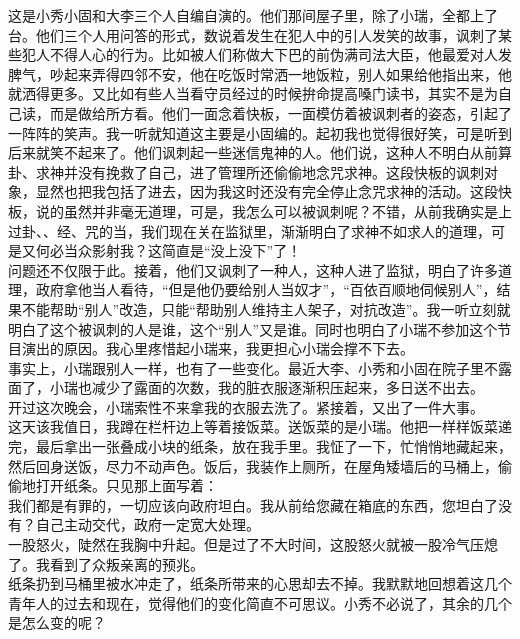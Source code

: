 这是小秀小固和大李三个人自编自演的。他们那间屋子里，除了小瑞，全都上了台。他们三个人用问答的形式，数说着发生在犯人中的引人发笑的故事，讽刺了某些犯人不得人心的行为。比如被人们称做大下巴的前伪满司法大臣，他最爱对人发脾气，吵起来弄得四邻不安，他在吃饭时常洒一地饭粒，别人如果给他指出来，他就洒得更多。又比如有些人当看守员经过的时候拚命提高嗓门读书，其实不是为自己读，而是做给所方看。他们一面念着快板，一面模仿着被讽刺者的姿态，引起了一阵阵的笑声。我一听就知道这主要是小固编的。起初我也觉得很好笑，可是听到后来就笑不起来了。他们讽刺起一些迷信鬼神的人。他们说，这种人不明白从前算卦、求神并没有挽救了自己，进了管理所还偷偷地念咒求神。这段快板的讽刺对象，显然也把我包括了进去，因为我这时还没有完全停止念咒求神的活动。这段快板，说的虽然并非毫无道理，可是，我怎么可以被讽刺呢？不错，从前我确实是上过卦、、经、咒的当，我们现在关在监狱里，渐渐明白了求神不如求人的道理，可是又何必当众影射我？这简直是“没上没下”了！\\

问题还不仅限于此。接着，他们又讽刺了一种人，这种人进了监狱，明白了许多道理，政府拿他当人看待，“但是他仍要给别人当奴才”，“百依百顺地伺候别人”，结果不能帮助“别人”改造，只能“帮助别人维持主人架子，对抗改造”。我一听立刻就明白了这个被讽刺的人是谁，这个“别人”又是谁。同时也明白了小瑞不参加这个节目演出的原因。我心里疼惜起小瑞来，我更担心小瑞会撑不下去。\\

事实上，小瑞跟别人一样，也有了一些变化。最近大李、小秀和小固在院子里不露面了，小瑞也减少了露面的次数，我的脏衣服逐渐积压起来，多日送不出去。\\

开过这次晚会，小瑞索性不来拿我的衣服去洗了。紧接着，又出了一件大事。\\

这天该我值日，我蹲在栏杆边上等着接饭菜。送饭菜的是小瑞。他把一样样饭菜递完，最后拿出一张叠成小块的纸条，放在我手里。我怔了一下，忙悄悄地藏起来，然后回身送饭，尽力不动声色。饭后，我装作上厕所，在屋角矮墙后的马桶上，偷偷地打开纸条。只见那上面写着：\\

我们都是有罪的，一切应该向政府坦白。我从前给您藏在箱底的东西，您坦白了没有？自己主动交代，政府一定宽大处理。\\

一股怒火，陡然在我胸中升起。但是过了不大时间，这股怒火就被一股冷气压熄了。我看到了众叛亲离的预兆。\\

纸条扔到马桶里被水冲走了，纸条所带来的心思却去不掉。我默默地回想着这几个青年人的过去和现在，觉得他们的变化简直不可思议。小秀不必说了，其余的几个是怎么变的呢？\\

